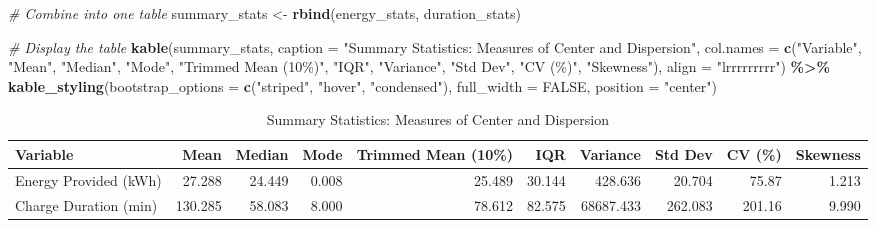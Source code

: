 \documentclass[
  12pt,
]{article}
\newenvironment{Shaded}{\begin{snugshade}}{\end{snugshade}}
\newcommand{\AttributeTok}[1]{\textcolor[rgb]{0.13,0.29,0.53}{#1}}
\newcommand{\CommentTok}[1]{\textcolor[rgb]{0.56,0.35,0.01}{\textit{#1}}}
\newcommand{\ConstantTok}[1]{\textcolor[rgb]{0.56,0.35,0.01}{#1}}
\newcommand{\FunctionTok}[1]{\textcolor[rgb]{0.13,0.29,0.53}{\textbf{#1}}}
\newcommand{\NormalTok}[1]{#1}
\newcommand{\OtherTok}[1]{\textcolor[rgb]{0.56,0.35,0.01}{#1}}
\newcommand{\SpecialCharTok}[1]{\textcolor[rgb]{0.81,0.36,0.00}{\textbf{#1}}}
\newcommand{\StringTok}[1]{\textcolor[rgb]{0.31,0.60,0.02}{#1}}
\begin{document}
\begin{Shaded}
\begin{Highlighting}[]
\CommentTok{\# Combine into one table}
\NormalTok{summary\_stats }\OtherTok{\textless{}{-}} \FunctionTok{rbind}\NormalTok{(energy\_stats, duration\_stats)}

\CommentTok{\# Display the table}
\FunctionTok{kable}\NormalTok{(summary\_stats, }
      \AttributeTok{caption =} \StringTok{"Summary Statistics: Measures of Center and Dispersion"}\NormalTok{,}
      \AttributeTok{col.names =} \FunctionTok{c}\NormalTok{(}\StringTok{"Variable"}\NormalTok{, }\StringTok{"Mean"}\NormalTok{, }\StringTok{"Median"}\NormalTok{, }\StringTok{"Mode"}\NormalTok{, }\StringTok{"Trimmed Mean (10\%)"}\NormalTok{, }
                    \StringTok{"IQR"}\NormalTok{, }\StringTok{"Variance"}\NormalTok{, }\StringTok{"Std Dev"}\NormalTok{, }\StringTok{"CV (\%)"}\NormalTok{, }\StringTok{"Skewness"}\NormalTok{),}
      \AttributeTok{align =} \StringTok{"lrrrrrrrrr"}\NormalTok{) }\SpecialCharTok{\%\textgreater{}\%}
  \FunctionTok{kable\_styling}\NormalTok{(}\AttributeTok{bootstrap\_options =} \FunctionTok{c}\NormalTok{(}\StringTok{"striped"}\NormalTok{, }\StringTok{"hover"}\NormalTok{, }\StringTok{"condensed"}\NormalTok{),}
                \AttributeTok{full\_width =} \ConstantTok{FALSE}\NormalTok{,}
                \AttributeTok{position =} \StringTok{"center"}\NormalTok{)}
\end{Highlighting}
\end{Shaded}

\begin{longtable}[t]{lrrrrrrrrr}
\caption{\label{tab:unnamed-chunk-9}Summary Statistics: Measures of Center and Dispersion}\\
\toprule
Variable & Mean & Median & Mode & Trimmed Mean (10\%) & IQR & Variance & Std Dev & CV (\%) & Skewness\\
\midrule
Energy Provided (kWh) & 27.288 & 24.449 & 0.008 & 25.489 & 30.144 & 428.636 & 20.704 & 75.87 & 1.213\\
Charge Duration (min) & 130.285 & 58.083 & 8.000 & 78.612 & 82.575 & 68687.433 & 262.083 & 201.16 & 9.990\\
\bottomrule
\end{longtable}
\end{document}
